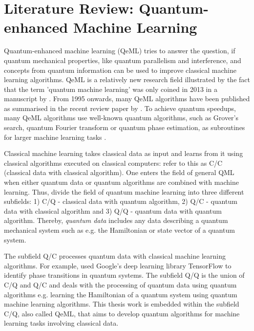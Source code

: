\chapter{Literature Review: Quantum-enhanced Machine Learning}\label{sec:qml}

Quantum-enhanced machine learning (QeML) tries to answer the question, if quantum mechanical properties, like quantum parallelism and interference, and concepts from quantum information can be used to improve classical machine learning algorithms. QeML is a relatively new research field illustrated by the fact that the term 'quantum machine learning' was only coined in 2013 in a manuscript by . From 1995 onwards, many QeML algorithms have been published as summarised in the recent review paper by . To achieve quantum speedups, many QeML algorithms use well-known quantum algorithms, such as Grover's search, quantum Fourier transform or quantum phase estimation, as subroutines for larger machine learning tasks \cite{aimeur2013quantum,anguita2003quantum,biamonte2016quantum,kapoor2016quantum,lloyd2013quantum}.

Classical machine learning takes classical data as input and learns from it using classical algorithms executed on classical computers:  refer to this as C/C (classical data with classical algorithm). One enters the field of general QML when either quantum data or quantum algorithms are combined with machine learning. Thus,  divide the field of quantum machine learning into three different subfields: 1) C/Q - classical data with quantum algorithm, 2) Q/C - quantum data with classical algorithm and 3) Q/Q - quantum data with quantum algorithm. Thereby, \emph{quantum data} includes any data describing a quantum mechanical system such as e.g. the Hamiltonian or state vector of a quantum system.

The subfield Q/C processes quantum data with classical machine learning algorithms. For example,  used Google's deep learning library TensorFlow to identify phase transitions in quantum systems. The subfield Q/Q is the union of C/Q and Q/C and deals with the processing of quantum data using quantum algorithms e.g. learning the Hamiltonian of a quantum system using quantum machine learning algorithms. This thesis work is embedded within the subfield C/Q, also called QeML, that aims to develop quantum algorithms for machine learning tasks involving classical data.

